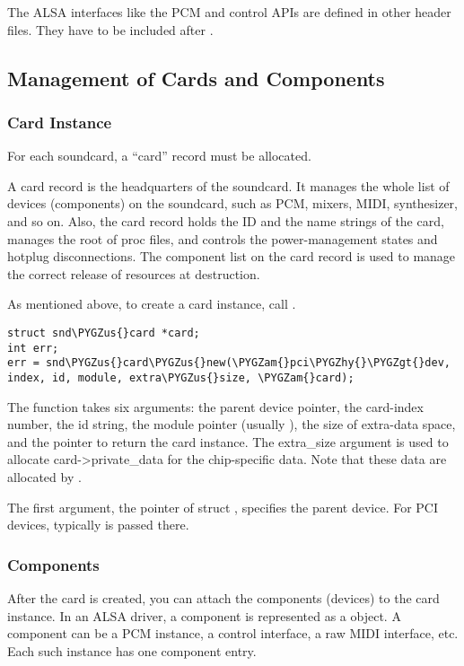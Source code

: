 \documentclass[a4paper,8pt,english]{sphinxmanual}
\def\PYGZus{\char`\_}
\def\PYGZam{\char`\&}
\def\PYGZgt{\char`\>}
\def\PYGZhy{\char`\-}
\begin{document}
The ALSA interfaces like the PCM and control APIs are defined in other
 header files. They have to be included after
.


\subsection{Management of Cards and Components}
\label{sound/kernel-api/writing-an-alsa-driver:management-of-cards-and-components}

\subsubsection{Card Instance}
\label{sound/kernel-api/writing-an-alsa-driver:card-instance}
For each soundcard, a “card” record must be allocated.

A card record is the headquarters of the soundcard. It manages the whole
list of devices (components) on the soundcard, such as PCM, mixers,
MIDI, synthesizer, and so on. Also, the card record holds the ID and the
name strings of the card, manages the root of proc files, and controls
the power-management states and hotplug disconnections. The component
list on the card record is used to manage the correct release of
resources at destruction.

As mentioned above, to create a card instance, call
.

\begin{Verbatim}[commandchars=\\\{\}]
struct snd\PYGZus{}card *card;
int err;
err = snd\PYGZus{}card\PYGZus{}new(\PYGZam{}pci\PYGZhy{}\PYGZgt{}dev, index, id, module, extra\PYGZus{}size, \PYGZam{}card);
\end{Verbatim}

The function takes six arguments: the parent device pointer, the
card-index number, the id string, the module pointer (usually
), the size of extra-data space, and the pointer to
return the card instance. The extra\_size argument is used to allocate
card-\textgreater{}private\_data for the chip-specific data. Note that these data are
allocated by .

The first argument, the pointer of struct , specifies the parent device. For PCI devices, typically
 is passed there.


\subsubsection{Components}
\label{sound/kernel-api/writing-an-alsa-driver:components}
After the card is created, you can attach the components (devices) to
the card instance. In an ALSA driver, a component is represented as a
 object. A component
can be a PCM instance, a control interface, a raw MIDI interface, etc.
Each such instance has one component entry.
\end{document}
